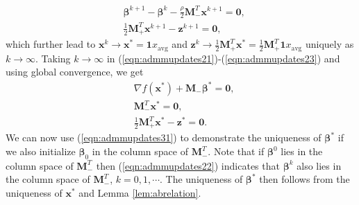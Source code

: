 \documentclass[journal]{IEEEtran}
\begin{document}
\begin{IEEEproof}
\begin{align}
\label{eqn:admmupdates22}
&\bm\beta^{k+1}-\bm\beta^k-\frac{\rho}{2}\bm M_-^T\bm x^{k+1}=\bm 0,\\
\label{eqn:admmupdates23}
&\frac{1}{2}\bm M_+^T\bm x^{k+1}-\bm z^{k+1}=\bm 0,
\end{align}
which further lead to $\bm x^k\to \bm x^*=\bm 1x_\text{avg}$ and $\bm z^k\to \frac{1}{2}\bm M_+^T\bm x^*= \frac{1}{2}\bm M_+^T\bm 1 x_\text{avg}$ uniquely as $k\to\infty$.
Taking $k\to\infty$ in (\ref{eqn:admmupdates21})-(\ref{eqn:admmupdates23}) and using global convergence, we get
\begin{align}
\label{eqn:admmupdates31}
&\nabla f(\bm x^*)+\bm M_-\bm\beta^*=\bm 0,\\
\label{eqn:admmupdates32}
&\bm M_-^T\bm x^{*}=\bm 0,\\
\label{eqn:admmupdates33}
&\frac{1}{2}\bm M_+^T\bm x^*-\bm z^*=\bm 0.
\end{align}
We can now use (\ref{eqn:admmupdates31}) to demonstrate the uniqueness of $\bm\beta^*$ if we also initialize $\bm\beta_0$ in the column space of $\bm M_-^T$. Note that if $\bm\beta^0$ lies in the column space of $\bm M_-^T$ then (\ref{eqn:admmupdates22}) indicates that $\bm\beta^k$ also lies in the column space of $\bm M_-^T$, $k=0,1,\cdots$. The uniqueness of $\bm\beta^*$ then follows from the uniqueness of $\bm x^*$ and Lemma \ref{lem:abrelation}.


\end{IEEEproof}
\end{document}
